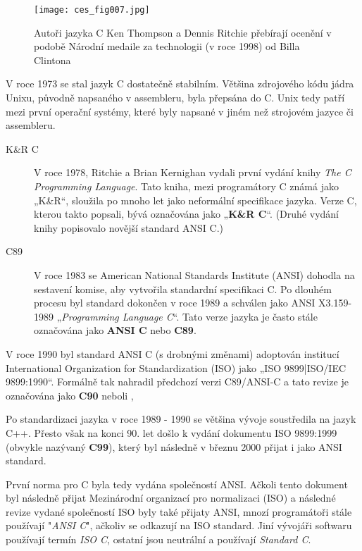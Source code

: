   \begin{figure}[ht!]  %
    \centering
    \texttt{[image: ces\_fig007.jpg]}
    \caption{Autoři jazyka C Ken Thompson a Dennis Ritchie přebírají ocenění v podobě Národní 
             medaile za technologii (v roce 1998) od Billa Clintona}
    \label{ces:fig007}
  \end{figure}

  V roce 1973 se stal jazyk C dostatečně stabilním. Většina zdrojového kódu jádra Unixu, původně 
  napsaného v assembleru, byla přepsána do C. Unix tedy patří mezi první operační systémy, které 
  byly napsané v jiném než strojovém jazyce či assembleru. 
  
  \begin{description}
    \item[K\&R C] V roce 1978, Ritchie a Brian Kernighan vydali první vydání knihy \emph{The C 
                  Programming Language}. Tato kniha, mezi programátory C známá jako „K\&R“, 
                  sloužila po mnoho let jako neformální specifikace jazyka. Verze C, kterou takto 
                  popsali, bývá označována jako „\textbf{K\&R C}“. (Druhé vydání knihy popisovalo 
                  novější standard ANSI C.)
    \item[C89]    V roce 1983 se American National Standards Institute (ANSI) dohodla na sestavení 
                  komise, aby vytvořila standardní specifikaci C. Po dlouhém procesu byl standard 
                  dokončen v roce 1989 a schválen jako ANSI X3.159-1989 „\emph{Programming Language 
                  C}“. Tato verze jazyka je často stále označována jako \textbf{ANSI C} nebo 
                \textbf{C89}.
  \end{description}
  

  

  
 
  
  V roce 1990 byl standard ANSI C (s drobnými změnami) adoptován institucí International 
  Organization for Standardization (ISO) jako „ISO 9899|ISO/IEC 9899:1990“. Formálně tak nahradil 
  předchozí verzi C89/ANSI-C a tato revize je označována jako \textbf{C90} neboli ,
  
  Po standardizaci jazyka v roce 1989 - 1990 se většina vývoje soustředila na jazyk C++. Přesto 
  však na konci 90. let došlo k vydání dokumentu ISO 9899:1999 (obvykle nazývaný \textbf{C99}), 
  který byl následně v březnu 2000 přijat i jako ANSI standard.
  
  První norma pro C byla tedy vydána společností ANSI. Ačkoli tento dokument byl následně přijat 
  Mezinárodní organizací pro normalizaci (ISO) a následné revize vydané společností ISO byly také 
  přijaty ANSI, mnozí programátoři stále používají "\emph{ANSI C}", ačkoliv se odkazují na ISO 
  standard. Jiní vývojáři softwaru používají termín \emph{ISO C}, ostatní jsou neutrální a 
  používají \emph{Standard C}.
    
